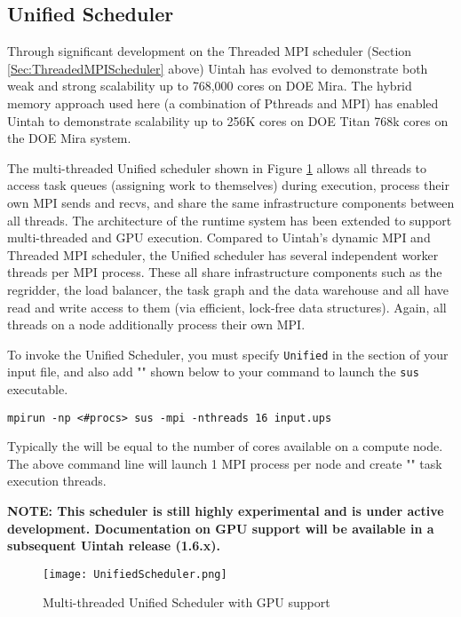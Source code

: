 \subsection{Unified Scheduler} \label{Sec:UnifiedScheduler}
Through significant development on the Threaded MPI scheduler (Section
\ref{Sec:ThreadedMPIScheduler} above) Uintah has evolved to demonstrate both
weak and strong scalability up to 768,000 cores on DOE Mira. The hybrid memory
approach used here (a combination of Pthreads and MPI) has enabled Uintah to
demonstrate scalability up to 256K cores on DOE Titan 768k cores on the DOE
Mira system.

The multi-threaded Unified scheduler shown in Figure \ref{fig:UnifiedScheduler}
allows all threads to access task queues (assigning work to themselves)
during execution, process their own MPI sends and recvs, and share the same
infrastructure components between all threads. The architecture of the runtime
system has been extended to support multi-threaded and GPU execution. Compared
to Uintah’s dynamic MPI and Threaded MPI scheduler, the Unified scheduler has
several independent worker threads per MPI process. These all share
infrastructure components such as the regridder, the load balancer, the task
graph and the data warehouse and all have read and write access to them (via
efficient, lock-free data structures). Again, all threads on a node
additionally process their own MPI.

To invoke the Unified Scheduler, you must specify \texttt{Unified} in the
 section of your input file, and also add
"" shown below to your command to launch the \texttt{sus}
executable.

\begin{Verbatim}[fontsize=\footnotesize]
mpirun -np <#procs> sus -mpi -nthreads 16 input.ups
\end{Verbatim}

Typically the  will be equal to the number of cores available on a
compute node. The above command line will launch 1 MPI process per node and
create "" task execution threads.

\vspace{20pt}

\textbf{NOTE: This scheduler is still highly experimental and is under active development. Documentation on GPU support will be available in a subsequent Uintah release (1.6.x).}

\begin{figure}[H]
  \centering
  \texttt{[image: UnifiedScheduler.png]}
  \caption{Multi-threaded Unified Scheduler with GPU support}
  \label{fig:UnifiedScheduler}
\end{figure}

